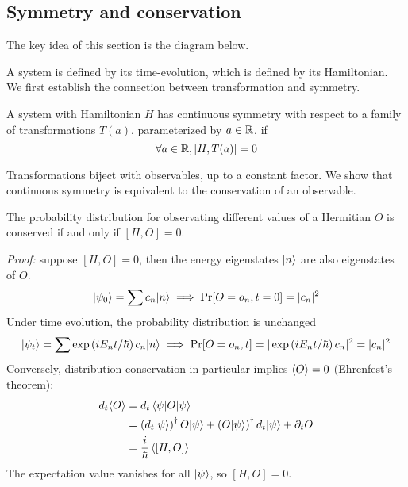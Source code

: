 \subsection{Symmetry and conservation}
The key idea of this section is the diagram below. 
\begin{center}\end{center}


A system is defined by its time-evolution, which is defined by its Hamiltonian. 
We first establish the connection between transformation and symmetry. 
\begin{definition}
    A system with Hamiltonian $H$ has continuous symmetry with respect to a family 
    of transformations $T(a)$, parameterized by $a\in \mathbb R$, if 
    \[ 
        \forall a\in \mathbb R, [H, T(a)] = 0
    \] 
\end{definition}

Transformations biject with observables, up to a constant factor. 
We show that continuous symmetry is equivalent to 
the conservation of an observable. 
\begin{theorem} 
    The probability distribution for observating different values of a Hermitian $O$ 
    is conserved if and only if $[H, O] = 0$.

    \textit{Proof:} suppose $[H, O]=0$, then the energy eigenstates $|n\rangle$ are also eigenstates of 
    $O$.
    \[ 
        |\psi_0\rangle = \sum c_n |n\rangle\implies \Pr[O=o_n, t=0] = |c_n|^2
    \] 
    Under time evolution, the probability distribution is unchanged 
    \[ 
        |\psi_t\rangle = \sum \exp\left(iE_n t/\hbar\right) c_n |n\rangle\implies 
        \Pr[O=o_n, t] = |\exp\left(iE_n t/\hbar\right) c_n|^2=|c_n|^2
    \]
    Conversely, distribution conservation in particular implies $\langle O\rangle = 0$ (Ehrenfest's theorem):
    \[ \begin{aligned}
        d_t\langle O\rangle 
            &= d_t\left\langle \psi|O|\psi \right\rangle \\ 
            &= \left(d_t|\psi\rangle\right)^\dag O|\psi\rangle + \left(O|\psi\rangle\right)^\dag d_t|\psi\rangle + \partial_{t} O \\ 
            &= \dfrac i {\hbar} \left\langle [H, O] \right\rangle
    \end{aligned}\] 
    The expectation value vanishes for all $|\psi\rangle$, so $[H, O]=0$. 
\end{theorem}

